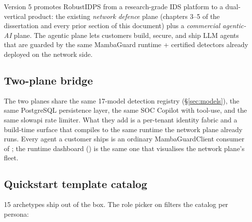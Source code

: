 \documentclass[11pt,a4paper]{article}
\begin{document}
Version 5 promotes RobustIDPS from a research-grade IDS platform to a
dual-vertical product: the existing \emph{network defence} plane
(chapters 3--5 of the dissertation and every prior section of this
document) plus a \emph{commercial agentic-AI} plane. The agentic plane
lets customers build, secure, and ship LLM agents that are guarded by
the same MambaGuard runtime + certified detectors already deployed on
the network side.

\subsection{Two-plane bridge}

The two planes share the same 17-model detection registry
(\S\ref{sec:models}), the same PostgreSQL persistence layer, the same
SOC Copilot with tool-use, and the same slowapi rate limiter. What
they add is a per-tenant identity fabric and a build-time surface that
compiles to the same runtime the network plane already runs. Every
agent a customer ships is an ordinary MambaGuardClient consumer of
; the runtime dashboard
() is the same one that visualises the
network plane's fleet.

\subsection{Quickstart template catalog}

15 archetypes ship out of the box. The role picker on
 filters the catalog per persona:
\end{document}
